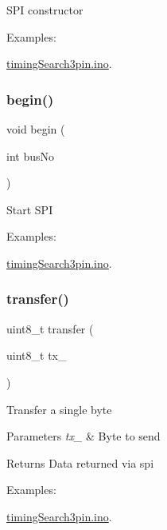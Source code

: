 S\+PI constructor \begin{Desc}
\item[Examples\+: ]\par
\hyperlink{timingSearch3pin_8ino-example}{timing\+Search3pin.\+ino}.\end{Desc}
\mbox{\label{group__Porting__SPI_gaf79095574842d60a6297aa5b01b6185f}} 
\subsubsection{\texorpdfstring{begin()}{begin()}}
{\footnotesize\ttfamily void begin (\begin{DoxyParamCaption}\item[{int}]{bus\+No }\end{DoxyParamCaption})}

Start S\+PI \begin{Desc}
\item[Examples\+: ]\par
\hyperlink{timingSearch3pin_8ino-example}{timing\+Search3pin.\+ino}.\end{Desc}
\mbox{\label{group__Porting__SPI_gad8a210abb2138c105350cc91972edfa9}} 
\subsubsection{\texorpdfstring{transfer()}{transfer()}}
{\footnotesize\ttfamily uint8\+\_\+t transfer (\begin{DoxyParamCaption}\item[{uint8\+\_\+t}]{tx\+\_\+ }\end{DoxyParamCaption})}

Transfer a single byte 
\begin{DoxyParams}{Parameters}
{\em tx\+\_\+} & Byte to send \\
\hline
\end{DoxyParams}
\begin{DoxyReturn}{Returns}
Data returned via spi 
\end{DoxyReturn}
\begin{Desc}
\item[Examples\+: ]\par
\hyperlink{timingSearch3pin_8ino-example}{timing\+Search3pin.\+ino}.\end{Desc}
\mbox{\label{group__Porting__SPI_ga26b5af7f6420d54b479af9eaf1b2e452}} 

